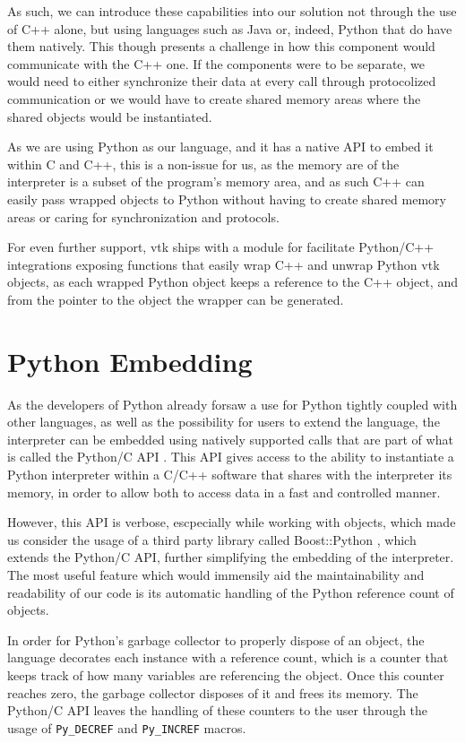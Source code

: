 As such, we can introduce these capabilities into our solution not through the use of C++ alone, but using languages such as Java or, indeed, Python that do have them natively. This though presents a challenge in how this component would communicate with the C++ one. If the components were to be separate, we would need to either synchronize their data at every call through protocolized communication or we would have to create shared memory areas where the shared objects would be instantiated.

As we are using Python as our language, and it has a native API to embed it within C and C++, this is a non-issue for us, as the memory are of the interpreter is a subset of the program's memory area, and as such C++ can easily pass wrapped objects to Python without having to create shared memory areas or caring for synchronization and protocols.

For even further support, \acrshort{vtk} ships with a module for facilitate Python/C++ integrations exposing functions that easily wrap C++ and unwrap Python \acrshort{vtk} objects, as each wrapped Python object keeps a reference to the C++ object, and from the pointer to the object the wrapper can be generated.

\section{Python Embedding}

As the developers of Python already forsaw a use for Python tightly coupled with other languages, as well as the possibility for users to extend the language, the interpreter can be embedded using natively supported calls that are part of what is called the Python/C API \cite{python_c_api}. This API gives access to the ability to instantiate a Python interpreter within a C/C++ software that shares with the interpreter its memory, in order to allow both to access data in a fast and controlled manner.

However, this API is verbose, escpecially while working with objects, which made us consider the usage of a third party library called Boost::Python
, which extends the Python/C API, further simplifying the embedding of the interpreter. The most useful feature which would immensily aid the maintainability and readability of our code is its automatic handling of the Python reference count of objects.

In order for Python's garbage collector to properly dispose of an object, the language decorates each instance with a reference count, which is a counter that keeps track of how many variables are referencing the object. Once this counter reaches zero, the garbage collector disposes of it and frees its memory. The Python/C API leaves the handling of these counters to the user through the usage of \verb|Py_DECREF| and \verb|Py_INCREF| macros.

